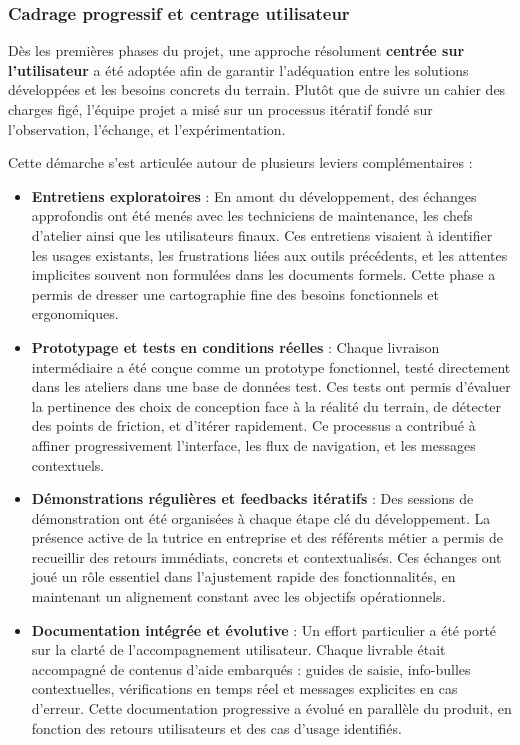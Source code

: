 \documentclass[11pt,a4paper]{article}
\begin{document}
\subsubsection{Cadrage progressif et centrage utilisateur}

Dès les premières phases du projet, une approche résolument \textbf{centrée sur l'utilisateur} a été adoptée afin de garantir l'adéquation entre les solutions développées et les besoins concrets du terrain. Plutôt que de suivre un cahier des charges figé, l’équipe projet a misé sur un processus itératif fondé sur l'observation, l’échange, et l’expérimentation.

Cette démarche s’est articulée autour de plusieurs leviers complémentaires :

\begin{itemize}
    \item \textbf{Entretiens exploratoires} : En amont du développement, des échanges approfondis ont été menés avec les techniciens de maintenance, les chefs d’atelier ainsi que les utilisateurs finaux. Ces entretiens visaient à identifier les usages existants, les frustrations liées aux outils précédents, et les attentes implicites souvent non formulées dans les documents formels. Cette phase a permis de dresser une cartographie fine des besoins fonctionnels et ergonomiques.

    \item \textbf{Prototypage et tests en conditions réelles} : Chaque livraison intermédiaire a été conçue comme un prototype fonctionnel, testé directement dans les ateliers dans une base de données test. Ces tests ont permis d’évaluer la pertinence des choix de conception face à la réalité du terrain, de détecter des points de friction, et d’itérer rapidement. Ce processus a contribué à affiner progressivement l’interface, les flux de navigation, et les messages contextuels.
 
    \item \textbf{Démonstrations régulières et feedbacks itératifs} : Des sessions de démonstration ont été organisées à chaque étape clé du développement. La présence active de la tutrice en entreprise et des référents métier a permis de recueillir des retours immédiats, concrets et contextualisés. Ces échanges ont joué un rôle essentiel dans l’ajustement rapide des fonctionnalités, en maintenant un alignement constant avec les objectifs opérationnels.

    \item \textbf{Documentation intégrée et évolutive} : Un effort particulier a été porté sur la clarté de l’accompagnement utilisateur. Chaque livrable était accompagné de contenus d’aide embarqués : guides de saisie, info-bulles contextuelles, vérifications en temps réel et messages explicites en cas d’erreur. Cette documentation progressive a évolué en parallèle du produit, en fonction des retours utilisateurs et des cas d’usage identifiés.
\end{itemize}
\end{document}
